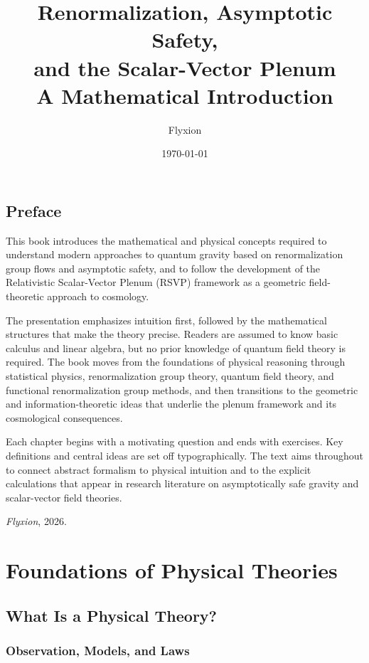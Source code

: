 \documentclass[12pt,a4paper,oneside]{book}
\title{\textbf{Renormalization, Asymptotic Safety,\\
and the Scalar-Vector Plenum}\\[0.8em]
{\large A Mathematical Introduction}}
\author{Flyxion}
\date{\today}
\theoremstyle{definition}
\theoremstyle{plain}
\theoremstyle{remark}
\begin{document}
\frontmatter
\maketitle

\chapter*{Preface}

This book introduces the mathematical and physical concepts required to
understand modern approaches to quantum gravity based on renormalization group
flows and asymptotic safety, and to follow the development of the
Relativistic Scalar-Vector Plenum (RSVP) framework as a geometric
field-theoretic approach to cosmology.

The presentation emphasizes intuition first, followed by the mathematical
structures that make the theory precise. Readers are assumed to know basic
calculus and linear algebra, but no prior knowledge of quantum field theory
is required. The book moves from the foundations of physical reasoning through
statistical physics, renormalization group theory, quantum field theory, and
functional renormalization group methods, and then transitions to the
geometric and information-theoretic ideas that underlie the plenum framework
and its cosmological consequences.

Each chapter begins with a motivating question and ends with exercises.
Key definitions and central ideas are set off typographically. The text
aims throughout to connect abstract formalism to physical intuition and
to the explicit calculations that appear in research literature on
asymptotically safe gravity and scalar-vector field theories.

\medskip
\noindent\textit{Flyxion}, 2026.

\tableofcontents

\mainmatter

\part{Foundations of Physical Theories}

\chapter{What Is a Physical Theory?}

\section{Observation, Models, and Laws}
\end{document}
